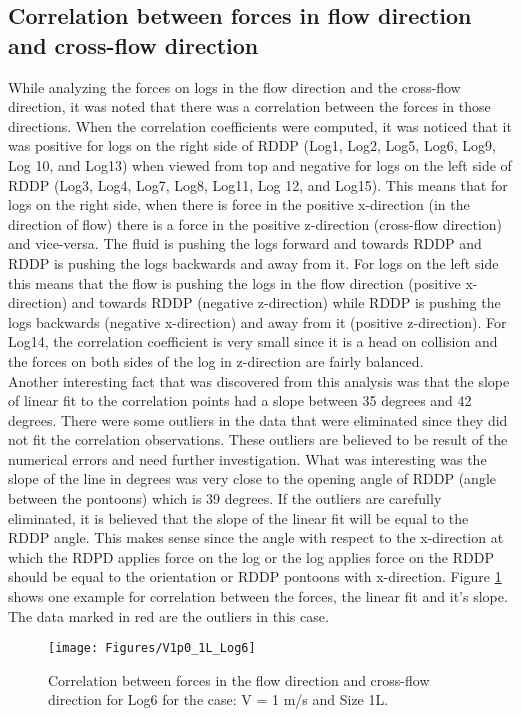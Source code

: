 \subsection{Correlation between forces in flow direction and cross-flow direction}
While analyzing the forces on logs in the flow direction and the cross-flow direction, it was noted that there was a correlation between the forces in those directions. When the correlation coefficients were computed, it was noticed that it was positive for logs on the right side of RDDP (Log1, Log2, Log5, Log6, Log9, Log 10, and Log13) when viewed from top and negative for logs on the left side of RDDP (Log3, Log4, Log7, Log8, Log11, Log 12, and Log15). This means that for logs on the right side, when there is force in the positive x-direction (in the direction of flow) there is a force in the positive z-direction (cross-flow direction) and vice-versa. The fluid is pushing the logs forward and towards RDDP and RDDP is pushing the logs backwards and away from it. For logs on the left side this means that the flow is pushing the logs in the flow direction (positive x-direction) and towards RDDP (negative z-direction) while RDDP is pushing the logs backwards (negative x-direction) and away from it (positive z-direction). For Log14, the correlation coefficient is very small since it is a head on collision and the forces on both sides of the log in z-direction are fairly balanced.\\
Another interesting fact that was discovered from this analysis was that the slope of linear fit to the correlation points had a slope between 35 degrees and 42 degrees. There were some outliers in the data that were eliminated since they did not fit the correlation observations. These outliers are believed to be result of the numerical errors and need further investigation. What was interesting was the slope of the line in degrees was very close to the opening angle of RDDP (angle between the pontoons) which is 39 degrees. If the outliers are carefully eliminated, it is believed that the slope of the linear fit will be equal to the RDDP angle. This makes sense since the angle with respect to the x-direction at which the RDPD applies force on the log or the log applies force on the RDDP should be equal to the orientation or RDDP pontoons with x-direction. Figure \ref{fig:V1p0_1L_Log6} shows one example for correlation between the forces, the linear fit and it's slope. The data marked in red are the outliers in this case.

\begin{figure}
\centering
\texttt{[image: Figures/V1p0\_1L\_Log6]}
\caption{\label{fig:V1p0_1L_Log6}Correlation between forces in the flow direction and cross-flow direction for Log6 for the case: V = 1 m/s and Size 1L.}
\end{figure}